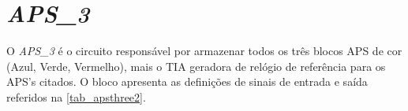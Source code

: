 \renewcommand{\NomeBloco}{\emph{APS\_3}}
\renewcommand{\NomeBlocoNoUnderline}{apsthree}
\renewcommand{\NomePTab}{tab_\NomeBlocoNoUnderline}
\renewcommand{\NomeSTab}{tab_\NomeBlocoNoUnderline2}
\renewcommand{\NomePFig}{fig_\NomeBlocoNoUnderline}
\renewcommand{\NomeSFig}{fig_\NomeBlocoNoUnderline2}
\renewcommand{\NomeTTab}{tab_\NomeBlocoNoUnderline3}
\renewcommand{\NomeQTab}{tab_\NomeBlocoNoUnderline4}

\section{\NomeBloco}

O \emph{\NomeBloco} \'e o circuito respons\'avel por armazenar todos os tr\^es blocos APS de cor (Azul, Verde, Vermelho), mais o TIA geradora de rel\'ogio de refer\^encia para os APS's citados. O bloco apresenta as defini{\c c}\~oes de sinais de entrada e sa\'ida referidos na \autoref{\NomeSTab}.

